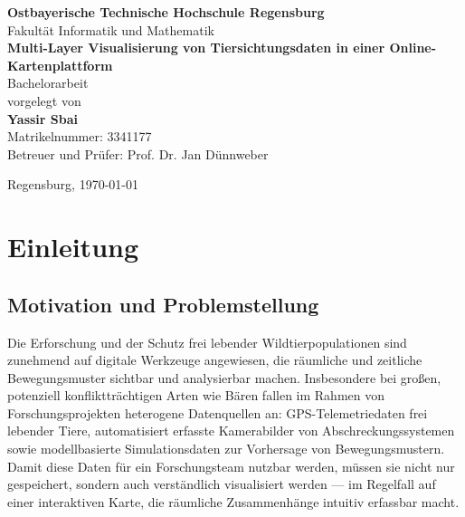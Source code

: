 \documentclass[12pt,a4paper]{report}
\begin{document}
\begin{titlepage}
    \centering
    \vspace*{2cm}

    {\LARGE\bfseries Ostbayerische Technische Hochschule Regensburg}\\[0.5cm]
    {\Large Fakultät Informatik und Mathematik}\\[3cm]

    {\huge\bfseries Multi-Layer Visualisierung von Tiersichtungsdaten in einer Online-Kartenplattform}\\[3cm]

    {\Large Bachelorarbeit}\\[1cm]

    vorgelegt von\\[0.5cm]
    {\Large\bfseries Yassir Sbai}\\[0.3cm]
    Matrikelnummer: 3341177\\[3cm]

    Betreuer und Prüfer: Prof. Dr. Jan Dünnweber\\


    \vfill

    Regensburg, \today
\end{titlepage}

\tableofcontents
\newpage

\chapter{Einleitung}

\section{Motivation und Problemstellung}

Die Erforschung und der Schutz frei lebender Wildtierpopulationen sind zunehmend auf digitale Werkzeuge angewiesen, die räumliche und zeitliche Bewegungsmuster sichtbar und analysierbar machen. Insbesondere bei großen, potenziell konfliktträchtigen Arten wie Bären fallen im Rahmen von Forschungsprojekten heterogene Datenquellen an: GPS-Telemetriedaten frei lebender Tiere, automatisiert erfasste Kamerabilder von Abschreckungssystemen sowie modellbasierte Simulationsdaten zur Vorhersage von Bewegungsmustern. Damit diese Daten für ein Forschungsteam nutzbar werden, müssen sie nicht nur gespeichert, sondern auch verständlich visualisiert werden — im Regelfall auf einer interaktiven Karte, die räumliche Zusammenhänge intuitiv erfassbar macht.
\end{document}
